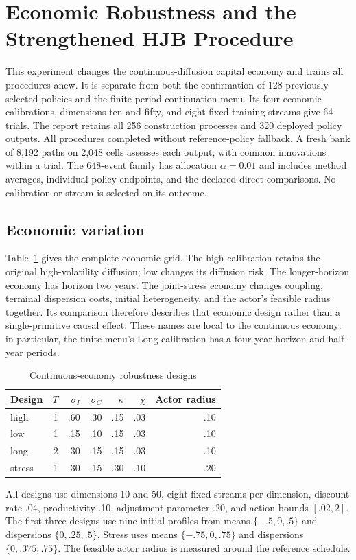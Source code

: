 \section{Economic Robustness and the Strengthened HJB Procedure}
\label{app:r16robustnessrecord}
This experiment changes the continuous-diffusion capital economy and trains
all procedures anew. It is separate from both the confirmation of 128
previously selected policies and the finite-period continuation menu. Its
four economic calibrations, dimensions ten and fifty, and eight fixed
training streams give 64 trials. The report retains all 256 construction
processes and 320 deployed policy outputs. All procedures completed without
reference-policy fallback. A fresh bank of 8,192 paths on 2,048 cells
assesses each output, with common innovations within a trial. The
648-event family has allocation $\alpha=0.01$ and includes method averages,
individual-policy endpoints, and the declared direct comparisons. No
calibration or stream is selected on its outcome.

\subsection{Economic variation}
Table~\ref{tab:r16ctcalibrations} gives the complete economic grid. The high
calibration retains the original high-volatility diffusion; low changes
its diffusion risk. The longer-horizon economy has horizon two years.
The joint-stress economy changes coupling, terminal dispersion costs,
initial heterogeneity, and the actor's feasible radius together. Its
comparison therefore describes that economic design rather than a
single-primitive causal effect. These names are local to the continuous
economy: in particular, the finite menu's Long calibration has a four-year
horizon and half-year periods.

\begin{table}[htbp]
\centering\small
\caption{Continuous-economy robustness designs}
\label{tab:r16ctcalibrations}
\begin{tabular}{lrrrrrr}
\toprule
Design & $T$ & $\sigma_I$ & $\sigma_C$ & $\kappa$ & $\chi$ & Actor radius\\
\midrule
high & 1 & .60 & .30 & .15 & .03 & .10\\
low & 1 & .15 & .10 & .15 & .03 & .10\\
long & 2 & .30 & .15 & .15 & .03 & .10\\
stress & 1 & .30 & .15 & .30 & .10 & .20\\
\bottomrule
\end{tabular}
\par\medskip\begin{minipage}{.97\linewidth}\footnotesize\raggedright
All designs use dimensions 10 and 50, eight fixed streams per dimension,
discount rate .04, productivity .10, adjustment parameter .20, and action
bounds $[.02,2]$. The first three designs use nine initial profiles from
means $\{-.5,0,.5\}$ and dispersions $\{0,.25,.5\}$. Stress uses
means $\{-.75,0,.75\}$ and dispersions $\{0,.375,.75\}$. The feasible
actor radius is measured around the reference schedule.
\end{minipage}
\end{table}

